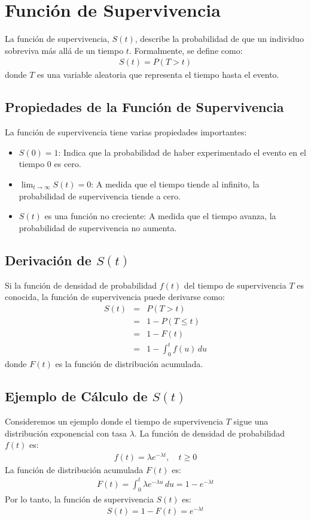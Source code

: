 \documentclass[a4paper]{report} %
\begin{document}
\section{Funci\'on de Supervivencia}
La funci\'on de supervivencia, $S(t)$, describe la probabilidad de que un individuo sobreviva m\'as all\'a de un tiempo $t$. Formalmente, se define como:
\begin{eqnarray*}
S(t) = P(T > t)
\end{eqnarray*}
donde $T$ es una variable aleatoria que representa el tiempo hasta el evento.

\subsection{Propiedades de la Funci\'on de Supervivencia}
La funci\'on de supervivencia tiene varias propiedades importantes:
\begin{itemize}
    \item $S(0) = 1$: Indica que la probabilidad de haber experimentado el evento en el tiempo 0 es cero.
    \item $\lim_{t \to \infty} S(t) = 0$: A medida que el tiempo tiende al infinito, la probabilidad de supervivencia tiende a cero.
    \item $S(t)$ es una funci\'on no creciente: A medida que el tiempo avanza, la probabilidad de supervivencia no aumenta.
\end{itemize}

\subsection{Derivaci\'on de $S(t)$}
Si la funci\'on de densidad de probabilidad $f(t)$ del tiempo de supervivencia $T$ es conocida, la funci\'on de supervivencia puede derivarse como:
\begin{eqnarray*}
S(t) &=& P(T > t) \\
     &=& 1 - P(T \leq t) \\
     &=& 1 - F(t) \\
     &=& 1 - \int_0^t f(u) \, du
\end{eqnarray*}
donde $F(t)$ es la funci\'on de distribuci\'on acumulada.

\subsection{Ejemplo de C\'alculo de $S(t)$}
Consideremos un ejemplo donde el tiempo de supervivencia $T$ sigue una distribuci\'on exponencial con tasa $\lambda$. La funci\'on de densidad de probabilidad $f(t)$ es:
\begin{eqnarray*}
f(t) = \lambda e^{-\lambda t}, \quad t \geq 0
\end{eqnarray*}
La funci\'on de distribuci\'on acumulada $F(t)$ es:
\begin{eqnarray*}
F(t) = \int_0^t \lambda e^{-\lambda u} \, du = 1 - e^{-\lambda t}
\end{eqnarray*}
Por lo tanto, la funci\'on de supervivencia $S(t)$ es:
\begin{eqnarray*}
S(t) = 1 - F(t) = e^{-\lambda t}
\end{eqnarray*}
\end{document}
